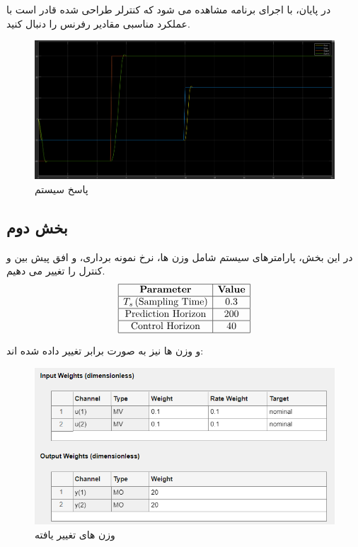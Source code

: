 در پایان، با اجرای برنامه مشاهده می شود که کنترلر طراحی شده قادر است با عملکرد مناسبی مقادیر رفرنس را دنبال کنید.
\begin{figure}
	\centering
	\includegraphics[width=1\linewidth]{../img/Q2_output}
	\caption{پاسخ سیستم}
	\label{fig:q2output}
\end{figure}

\subsection{بخش دوم}
در این بخش، پارامترهای سیستم شامل وزن ها، نرخ نمونه برداری، و افق پیش بین و کنترل را تغییر می دهیم.
\[
\begin{array}{|c|c|}
	\hline
	\textbf{Parameter} & \textbf{Value} \\ 
	\hline
	T_s \, (\text{Sampling Time}) & 0.3 \\ 
	\hline
	\text{Prediction Horizon} & 200 \\ 
	\hline
	\text{Control Horizon} & 40 \\ 
	\hline
\end{array}
\]

 و وزن ها نیز به صورت برابر تغییر داده شده اند:
 \begin{figure}
 	\centering
 	\includegraphics[width=1\linewidth]{../img/Q2_weights_updated}
 	\caption{وزن های تغییر یافته}
 	\label{fig:q2weightsupdated}
 \end{figure}
 
